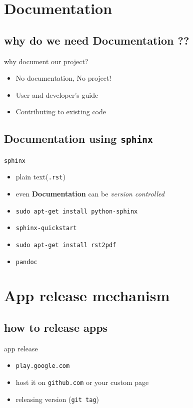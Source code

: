 \documentclass{beamer}
\begin{document}
 \section{Documentation}
 \subsection{why do we need Documentation ??}
 \begin{frame}{why document our project?}
     \begin{itemize}
     \item No documentation, No project!
     \item User and developer's guide
     \item Contributing to existing code 
     \end{itemize}
 \end{frame}

 \subsection{Documentation using {\tt sphinx}}
 \begin{frame}{{\tt sphinx}}
   \begin{itemize}
   \item plain text({\tt .rst})
   \item even {\bf Documentation} can be {\em version controlled}
   \end{itemize}
   \begin{block}{}
     \begin{itemize}
     \item {\tt sudo apt-get install python-sphinx}
     \item {\tt sphinx-quickstart} \pause
     \item {\tt sudo apt-get install rst2pdf}
     \item {\tt pandoc}
     \end{itemize} \pause
   \end{block}
 \end{frame}

\section{App release mechanism}
\subsection{how to release apps}
\begin{frame}{app release}
    \begin{itemize}
    \item {\tt play.google.com}
    \item host it on {\tt github.com} or your custom page
    \item releasing version ({\tt git tag})
    \end{itemize}
\end{frame}
\end{document}

